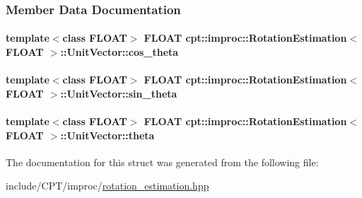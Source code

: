 \subsubsection{Member Data Documentation}
\hypertarget{structcpt_1_1improc_1_1_rotation_estimation_1_1_unit_vector_a25c517207e9424fd78d8790ce73eb841}{
\paragraph[{cos\-\_\-theta}]{\setlength{\rightskip}{0pt plus 5cm}template$<$class F\-L\-O\-A\-T$>$ F\-L\-O\-A\-T {\bf cpt\-::improc\-::\-Rotation\-Estimation}$<$ F\-L\-O\-A\-T $>$\-::Unit\-Vector\-::cos\-\_\-theta}}\label{structcpt_1_1improc_1_1_rotation_estimation_1_1_unit_vector_a25c517207e9424fd78d8790ce73eb841}
\hypertarget{structcpt_1_1improc_1_1_rotation_estimation_1_1_unit_vector_a1e37e8c6a56ac786337bf22a37dbee6a}{
\paragraph[{sin\-\_\-theta}]{\setlength{\rightskip}{0pt plus 5cm}template$<$class F\-L\-O\-A\-T$>$ F\-L\-O\-A\-T {\bf cpt\-::improc\-::\-Rotation\-Estimation}$<$ F\-L\-O\-A\-T $>$\-::Unit\-Vector\-::sin\-\_\-theta}}\label{structcpt_1_1improc_1_1_rotation_estimation_1_1_unit_vector_a1e37e8c6a56ac786337bf22a37dbee6a}
\hypertarget{structcpt_1_1improc_1_1_rotation_estimation_1_1_unit_vector_aab5114d631110a4bc0bafedea2a005cf}{
\paragraph[{theta}]{\setlength{\rightskip}{0pt plus 5cm}template$<$class F\-L\-O\-A\-T$>$ F\-L\-O\-A\-T {\bf cpt\-::improc\-::\-Rotation\-Estimation}$<$ F\-L\-O\-A\-T $>$\-::Unit\-Vector\-::theta}}\label{structcpt_1_1improc_1_1_rotation_estimation_1_1_unit_vector_aab5114d631110a4bc0bafedea2a005cf}


The documentation for this struct was generated from the following file\-:\begin{DoxyCompactItemize}
\item 
include/\-C\-P\-T/improc/\hyperlink{improc_2rotation__estimation_8hpp}{rotation\-\_\-estimation.\-hpp}\end{DoxyCompactItemize}
